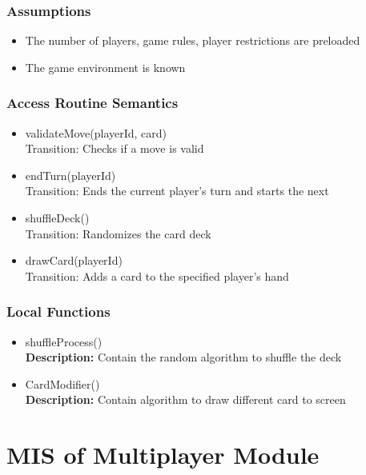 \documentclass[12pt, titlepage]{article}
\begin{document}
\subsubsection{Assumptions}
\begin{itemize}
\item The number of players, game rules, player restrictions are preloaded
\item The game environment is known
\end{itemize}

\subsubsection{Access Routine Semantics}

\begin{itemize}
\item validateMove(playerId, card)\\
Transition: Checks if a move is valid

\item endTurn(playerId)\\
Transition: Ends the current player's turn and starts the next

\item shuffleDeck()\\
Transition: Randomizes the card deck

\item drawCard(playerId)\\
Transition: Adds a card to the specified player’s hand

\end{itemize}


\subsubsection{Local Functions}
\begin{itemize}
\item shuffleProcess()\\
\textbf{Description:} Contain the random algorithm to shuffle the deck
\item CardModifier()\\
\textbf{Description:} Contain algorithm to draw different card to screen
\end{itemize}



\section{MIS of Multiplayer Module} 
\end{document}
